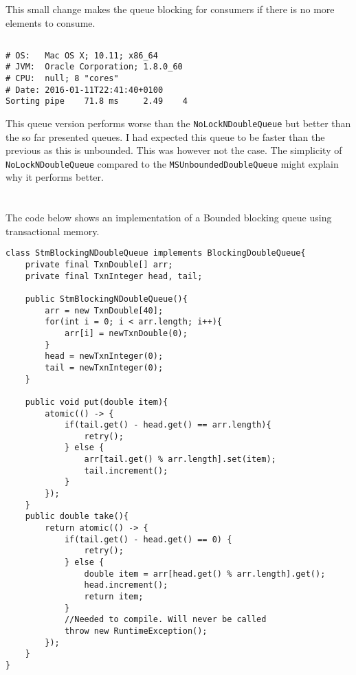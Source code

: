 \documentclass{ituhandin}
\begin{document}
This small change makes the queue blocking for consumers if there is no more elements to consume. 

\section{}
\begin{lstlisting}[language={},frame={}]
# OS:   Mac OS X; 10.11; x86_64
# JVM:  Oracle Corporation; 1.8.0_60
# CPU:  null; 8 "cores"
# Date: 2016-01-11T22:41:40+0100
Sorting pipe    71.8 ms     2.49    4
\end{lstlisting}

This queue version performs worse than the \texttt{NoLockNDoubleQueue} but better than the so far presented queues. I had expected this queue to be faster than the previous as this is unbounded. This was however not the case. The simplicity of \texttt{NoLockNDoubleQueue} compared to the \texttt{MSUnboundedDoubleQueue} might explain why it performs better.

\chapter{} %
\section{}
The code below shows an implementation of a Bounded blocking queue using transactional memory.
\begin{lstlisting}[caption=Implementation of the \texttt{StmBlockNDoubleQueue}]
class StmBlockingNDoubleQueue implements BlockingDoubleQueue{
    private final TxnDouble[] arr;
    private final TxnInteger head, tail;

    public StmBlockingNDoubleQueue(){
        arr = new TxnDouble[40];
        for(int i = 0; i < arr.length; i++){
            arr[i] = newTxnDouble(0);
        }
        head = newTxnInteger(0);
        tail = newTxnInteger(0);
    } 

    public void put(double item){
        atomic(() -> {
            if(tail.get() - head.get() == arr.length){
                retry();
            } else {
                arr[tail.get() % arr.length].set(item);
                tail.increment(); 
            } 
        });
    }
    public double take(){ 
        return atomic(() -> {
            if(tail.get() - head.get() == 0) {
                retry();
            } else {
                double item = arr[head.get() % arr.length].get();
                head.increment();
                return item;
            }
            //Needed to compile. Will never be called
            throw new RuntimeException(); 
        });
    }
}
\end{lstlisting}
\end{document}
